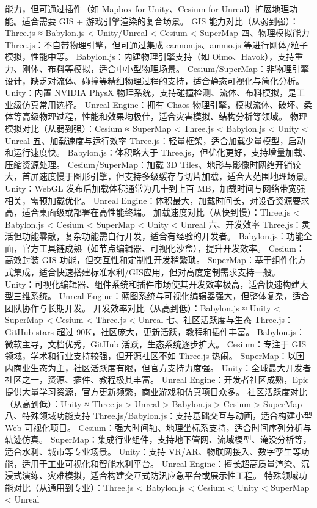 {{{能力，但可通过插件（如 Mapbox for Unity、Cesium for Unreal）扩展地理功能。适合需要 GIS + 游戏引擎渲染的复合场景。 GIS 能力对比（从弱到强）： Three.js ≈ Babylon.js \textless{} Unity/Unreal \textless{} Cesium \textless{} SuperMap 四、物理模拟能力 Three.js：不自带物理引擎，但可通过集成 cannon.js、ammo.js 等进行刚体/粒子模拟，性能中等。 Babylon.js：内建物理引擎支持（如 Oimo、Havok），支持重力、刚体、布料等模拟，适合中小型物理场景。 Cesium/SuperMap：非物理引擎设计，缺乏对流体、碰撞等精细物理过程的支持，适合静态可视化与简化分析。 Unity：内置 NVIDIA PhysX 物理系统，支持碰撞检测、流体、布料模拟，是工业级仿真常用选择。 Unreal Engine：拥有 Chaos 物理引擎，模拟流体、破坏、柔体等高级物理过程，性能和效果均极佳，适合灾害模拟、结构分析等领域。 物理模拟对比（从弱到强）：Cesium ≈ SuperMap \textless{} Three.js \textless{} Babylon.js \textless{} Unity \textless{} Unreal 五、加载速度与运行效率 Three.js：轻量框架，适合加载少量模型，启动和运行速度快。 Babylon.js：体积略大于 Three.js，但优化更好，支持增量加载、压缩资源处理。 Cesium/SuperMap：加载 3D Tiles、地形与影像时网络开销较大，首屏速度慢于图形引擎，但支持多级缓存与切片加载，适合大范围地理场景。 Unity：WebGL 发布后加载体积通常为几十到上百 MB，加载时间与网络带宽强相关，需预加载优化。 Unreal Engine：体积最大，加载时间长，对设备资源要求高，适合桌面级或部署在高性能终端。 加载速度对比（从快到慢）：Three.js \textless{} Babylon.js \textless{} Cesium \textless{} SuperMap \textless{} Unity \textless{} Unreal 六、开发效率 Three.js：灵活但功能零散，复杂功能需自行开发，适合有经验的开发者。 Babylon.js：功能全面，官方工具链成熟（如节点编辑器、可视化沙盒），提升开发效率。 Cesium：高效封装 GIS 功能，但交互性和定制性开发稍繁琐。 SuperMap：基于组件化方式集成，适合快速搭建标准水利/GIS应用，但对高度定制需求支持一般。 Unity：可视化编辑器、组件系统和插件市场使其开发效率极高，适合快速构建大型三维系统。 Unreal Engine：蓝图系统与可视化编辑器强大，但整体复杂，适合团队协作与长期开发。 开发效率对比（从高到低）：Babylon.js ≈ Unity \textless{} SuperMap \textless{} Cesium \textless{} Three.js \textless{} Unreal 七、社区活跃度与生态 Three.js：GitHub stars 超过 90K，社区庞大，更新活跃，教程和插件丰富。 Babylon.js：微软主导，文档优秀，GitHub 活跃，生态系统逐步扩大。 Cesium：专注于 GIS 领域，学术和行业支持较强，但开源社区不如 Three.js 热闹。 SuperMap：以国内商业生态为主，社区活跃度有限，但官方支持力度强。 Unity：全球最大开发者社区之一，资源、插件、教程极其丰富。 Unreal Engine：开发者社区成熟，Epic 提供大量学习资源，官方更新频繁，商业游戏和仿真项目众多。 社区活跃度对比（从高到低）：Unity ≈ Three.js \textgreater{} Unreal \textgreater{} Babylon.js \textgreater{} Cesium \textgreater{} SuperMap 八、特殊领域功能支持 Three.js/Babylon.js：支持基础交互与动画，适合构建小型 Web 可视化项目。 Cesium：强大时间轴、地理坐标系支持，适合时间序列分析与轨迹仿真。 SuperMap：集成行业组件，支持地下管网、流域模型、淹没分析等，适合水利、城市等专业场景。 Unity：支持 VR/AR、物联网接入、数字孪生等功能，适用于工业可视化和智能水利平台。 Unreal Engine：擅长超高质量渲染、沉浸式演练、灾难模拟，适合构建交互式防汛应急平台或展示性工程。 特殊领域功能对比（从通用到专业）：Three.js \textless{} Babylon.js \textless{} Cesium \textless{} Unity \textless{} SuperMap \textless{} Unreal }}}
